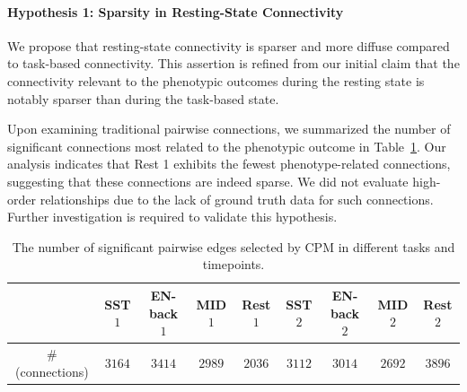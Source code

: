 \paragraph{Hypothesis 1: Sparsity in Resting-State Connectivity}
We propose that resting-state connectivity is sparser and more diffuse compared to task-based connectivity. This assertion is refined from our initial claim that the connectivity relevant to the phenotypic outcomes during the resting state is notably sparser than during the task-based state.

Upon examining traditional pairwise connections, we summarized the number of significant connections most related to the phenotypic outcome in Table~\ref{tab:num_sig_fail}. Our analysis indicates that Rest 1 exhibits the fewest phenotype-related connections, suggesting that these connections are indeed sparse. We did not evaluate high-order relationships due to the lack of ground truth data for such connections. Further investigation is required to validate this hypothesis. 

\begin{table}[H]
    \centering
    \begin{tabular}{c|cccccccc}
    \toprule
	& SST $1$ 	&EN-back $1$ 	&MID $1$ 	&Rest $1$ 	&SST $2$ 	&EN-back $2$ 	&MID $2$ 	&Rest $2$ \\
    \midrule
\# (connections) 	&$3164$ 	&$3414$ 	&$2989$ 	&$2036$ 	&$3112$ 	&$3014$ 	&$2692$ 	&$3896$\\
\bottomrule
    \end{tabular}
    \caption{The number of significant pairwise edges selected by CPM in different tasks and timepoints.}
    \label{tab:num_sig_fail}
\end{table}



